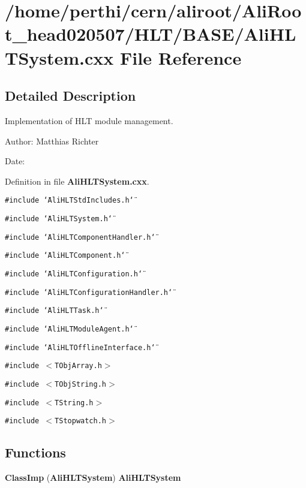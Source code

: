 \section{/home/perthi/cern/aliroot/Ali\-Root\_\-head020507/HLT/BASE/Ali\-HLTSystem.cxx File Reference}
\label{AliHLTSystem_8cxx}


\subsection{Detailed Description}
Implementation of HLT module management. 

\begin{Desc}
\item[Author:]Matthias Richter \end{Desc}
\begin{Desc}
\item[Date:]\end{Desc}


Definition in file {\bf Ali\-HLTSystem.cxx}.

{\tt \#include \char`\"{}Ali\-HLTStd\-Includes.h\char`\"{}}\par
{\tt \#include \char`\"{}Ali\-HLTSystem.h\char`\"{}}\par
{\tt \#include \char`\"{}Ali\-HLTComponent\-Handler.h\char`\"{}}\par
{\tt \#include \char`\"{}Ali\-HLTComponent.h\char`\"{}}\par
{\tt \#include \char`\"{}Ali\-HLTConfiguration.h\char`\"{}}\par
{\tt \#include \char`\"{}Ali\-HLTConfiguration\-Handler.h\char`\"{}}\par
{\tt \#include \char`\"{}Ali\-HLTTask.h\char`\"{}}\par
{\tt \#include \char`\"{}Ali\-HLTModule\-Agent.h\char`\"{}}\par
{\tt \#include \char`\"{}Ali\-HLTOffline\-Interface.h\char`\"{}}\par
{\tt \#include $<$TObj\-Array.h$>$}\par
{\tt \#include $<$TObj\-String.h$>$}\par
{\tt \#include $<$TString.h$>$}\par
{\tt \#include $<$TStopwatch.h$>$}\par
\subsection*{Functions}
\begin{CompactItemize}
\item 
{\bf Class\-Imp} ({\bf Ali\-HLTSystem}) {\bf Ali\-HLTSystem}
\end{CompactItemize}


